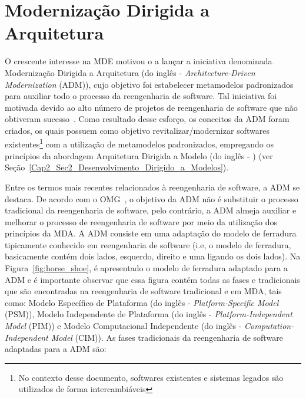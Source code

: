 \section{Modernização Dirigida a Arquitetura}\label{sec:modernizacaoOrientada_Arquitetura}


O crescente interesse na MDE motivou o  a lançar a iniciativa denominada Modernização Dirigida a Arquitetura (do inglês - \textit{Architecture-Driven Modernization} (ADM)), cujo objetivo foi estabelecer metamodelos padronizados para auxiliar todo o  processo da reengenharia de software. Tal iniciativa foi motivada devido ao alto número de projetos de reengenharia de software que não obtiveram sucesso~\cite{Sneed_2005, Demeyer2}. Como resultado desse esforço, os conceitos da ADM foram criados, os quais possuem como objetivo revitalizar/modernizar softwares existentes\footnote{No contexto desse documento, softwares existentes e sistemas legados são utilizados de forma intercambiáveis} com a utilização de metamodelos padronizados, empregando os princípios da abordagem Arquitetura Dirigida a Modelo (do inglês - ) (ver Seção~\ref{Cap2_Sec2_Desenvolvimento_Dirigido_a_Modelos}). %

Entre os termos mais recentes relacionados à reengenharia de software, a ADM se destaca. De acordo com o OMG~\cite{OMG_OMG}, o objetivo da ADM não é substituir o processo tradicional da reengenharia de software, pelo contrário, a ADM almeja auxiliar e melhorar o processo de reengenharia de software por meio da utilização dos princípios da MDA. A ADM consiste em uma adaptação do modelo de ferradura tipicamente conhecido em reengenharia de software (i.e, o modelo de ferradura, basicamente contém dois lados, esquerdo, direito e uma  ligando os dois lados). Na Figura~\ref{fig:horse_shoe}, é apresentado o modelo de ferradura adaptado para a ADM e é importante observar que essa figura contém todas as fases e  tradicionais que são encontradas na reengenharia de software tradicional e em MDA, tais como: Modelo Específico de Plataforma (do inglês - \textit{Platform-Specific Model} (PSM)), Modelo Independente de Plataforma (do inglês - \textit{Platform-Independent Model} (PIM)) e Modelo Computacional Independente (do inglês - \textit{Computation-Independent Model} (CIM)). As fases tradicionais da reengenharia de software adaptadas para a ADM são:


